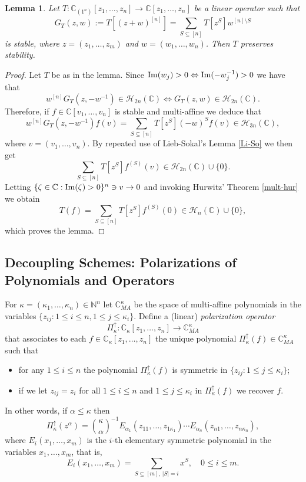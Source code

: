 \documentclass[10pt,reqno]{amsart}
\theoremstyle{plain}
\newtheorem{lemma}[theorem]{Lemma}
\theoremstyle{definition}
\theoremstyle{remark}
\numberwithin{equation}{section}
\newcommand{\NN}{\mathbb{N}}
\newcommand{\HH}{\mathcal{H}}
\newcommand{\CC}{\mathbb{C}}
\newcommand{\CM}{\mathbb{C}_{ {MA}}}
\renewcommand{\Im}{{\rm Im}}
\begin{document}
\begin{lemma}\label{ma-case}
Let $T : \CC_{(1^n)}[z_1,\ldots,z_n] \rightarrow 
\CC[z_1,\ldots,z_n]$ be a
linear operator such that
$$
G_{T}(z,w):=T\!\left[(z+w)^{[n]}\right] 
=\sum_{S \subseteq [n]} T\left[z^S\right]w^{[n] 
\setminus S}  
$$
is stable, where $z=(z_1,\ldots,z_m)$ and $w=(w_1,\ldots,w_n)$. 
Then $T$ preserves stability. 
\end{lemma}

\begin{proof}
Let $T$ be as in the lemma. Since 
$\Im(w_j)>0 \Leftrightarrow \Im(-w_j^{-1}) >0$ we have  that 
$$w^{[n]}G_T(z,-w^{-1}) \in \HH_{2n}(\CC)\Longleftrightarrow 
G_T(z,w) \in  \HH_{2n}(\CC).$$
Therefore, if $f\in\CC[v_1,\ldots,v_n]$ is stable and multi-affine we deduce 
that
$$
w^{[n]}G_T(z,-w^{-1})f(v)
= \sum_{S \subseteq [n]} T\left[z^S\right](-w)^{S}f(v) 
\in \HH_{3n}(\CC),
$$
where $v=(v_1,\ldots,v_n)$.
By repeated use of Lieb-Sokal's Lemma \ref{Li-So} we then get
$$
\sum_{S \subseteq [n]} T\left[z^S\right]f^{(S)}(v) 
\in \HH_{2n}(\CC)\cup\{0\}.
$$
Letting $\{\zeta \in \CC: \Im(\zeta)>0\}^n\ni v\to 0$ and invoking Hurwitz' 
Theorem \ref{mult-hur} we obtain
$$
T(f)=\sum_{S \subseteq [n]} T\left[z^S\right]f^{(S)}(0) 
\in \HH_{n}(\CC)\cup\{0\},
$$
which proves the lemma.
\end{proof}



\subsection{Decoupling Schemes: Polarizations of Polynomials and 
Operators}\label{ss-61}

For $\kappa =(\kappa_1,\ldots,\kappa_n)\in \NN^n$ let $\CM^\kappa$ be the 
space of multi-affine 
polynomials in the variables 
$\{ z_{ij} : 1\leq i \leq n, 1\leq j \leq \kappa_i\}$. 
Define a (linear) {\em polarization operator} 
$$
\Pi_\kappa^\uparrow : \CC_\kappa[z_1, \ldots, z_n] \rightarrow \CM^\kappa
$$ 
that associates to each $f\in \CC_\kappa[z_1, \ldots, z_n]$ 
the unique polynomial 
$\Pi_\kappa^\uparrow(f) \in \CM^\kappa$ such that 
\begin{itemize}
\item[(a)] for any $1 \leq i \leq n$ the polynomial  
$\Pi_\kappa^\uparrow(f)$ is symmetric in 
$\{ z_{ij} : 1\leq j \leq \kappa_i\}$; 
\item[(b)] if we let  $z_{ij}=z_i$ for all $1\le i\le n$ and 
$1\le j\le \kappa_i$
in $\Pi_\kappa^\uparrow(f)$ we recover $f$. 
\end{itemize}
In other words, if $\alpha \leq \kappa$ then  
$$
\Pi_\kappa^\uparrow(z^\alpha)= {\binom {\kappa} {\alpha} }^{-1} 
E_{\alpha_1}(z_{11},\ldots, z_{1\kappa_1})\cdots 
E_{\alpha_n}(z_{n1},\ldots, z_{n\kappa_n}),
$$
where $E_i(x_1,\ldots, x_m)$ is the $i$-th elementary symmetric polynomial in 
the variables $x_1, \ldots, x_m$, that is,
$$
E_i(x_1,\ldots, x_m)= \sum_{S\subseteq [m],\, |S|=i}x^S, \quad 0\leq i \leq m.
$$
\end{document}
